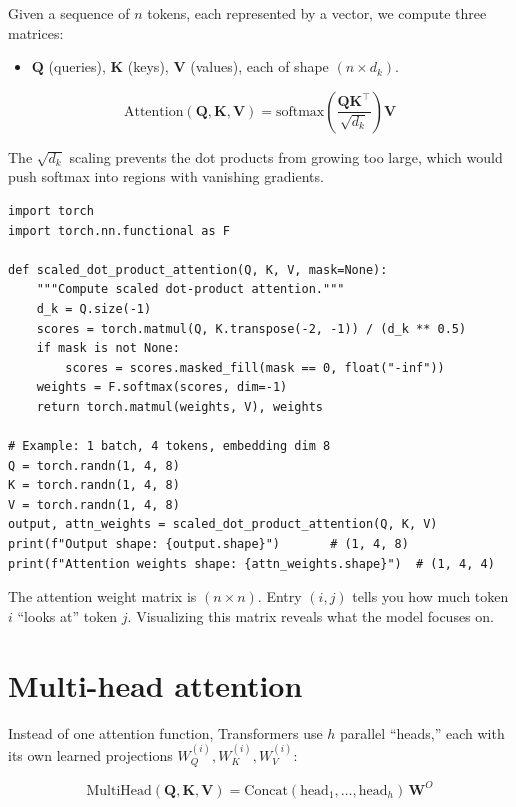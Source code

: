 Given a sequence of $n$ tokens, each represented by a vector, we compute three matrices:
\begin{itemize}
  \item $\mathbf{Q}$ (queries), $\mathbf{K}$ (keys), $\mathbf{V}$ (values), each of shape $(n \times d_k)$.
\end{itemize}

\[
\text{Attention}(\mathbf{Q}, \mathbf{K}, \mathbf{V}) = \text{softmax}\!\left(\frac{\mathbf{Q}\mathbf{K}^\top}{\sqrt{d_k}}\right)\mathbf{V}
\]

The $\sqrt{d_k}$ scaling prevents the dot products from growing too large, which would push softmax into regions with vanishing gradients.

\begin{verbatim}
import torch
import torch.nn.functional as F

def scaled_dot_product_attention(Q, K, V, mask=None):
    """Compute scaled dot-product attention."""
    d_k = Q.size(-1)
    scores = torch.matmul(Q, K.transpose(-2, -1)) / (d_k ** 0.5)
    if mask is not None:
        scores = scores.masked_fill(mask == 0, float("-inf"))
    weights = F.softmax(scores, dim=-1)
    return torch.matmul(weights, V), weights

# Example: 1 batch, 4 tokens, embedding dim 8
Q = torch.randn(1, 4, 8)
K = torch.randn(1, 4, 8)
V = torch.randn(1, 4, 8)
output, attn_weights = scaled_dot_product_attention(Q, K, V)
print(f"Output shape: {output.shape}")       # (1, 4, 8)
print(f"Attention weights shape: {attn_weights.shape}")  # (1, 4, 4)
\end{verbatim}

\begin{aitip}
The attention weight matrix is $(n \times n)$. Entry $(i, j)$ tells you how much token $i$ ``looks at'' token $j$. Visualizing this matrix reveals what the model focuses on.
\end{aitip}

\section{Multi-head attention}

Instead of one attention function, Transformers use $h$ parallel ``heads,'' each with its own learned projections $W_Q^{(i)}, W_K^{(i)}, W_V^{(i)}$:

\[
\text{MultiHead}(\mathbf{Q}, \mathbf{K}, \mathbf{V}) = \text{Concat}(\text{head}_1, \ldots, \text{head}_h)\,\mathbf{W}^O
\]

